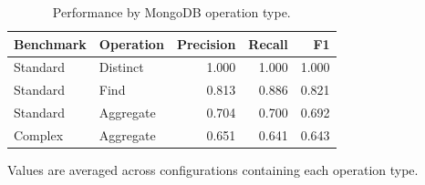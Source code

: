 \begin{table}[htbp]
\centering
\small
\caption{Performance by MongoDB operation type.}
\label{tab:operation-type-performance}
\begin{tabular}{llrrr}
\toprule
Benchmark & Operation & Precision & Recall & F1 \\
\midrule
Standard & Distinct & 1.000 & 1.000 & 1.000 \\
Standard & Find & 0.813 & 0.886 & 0.821 \\
Standard & Aggregate & 0.704 & 0.700 & 0.692 \\
Complex & Aggregate & 0.651 & 0.641 & 0.643 \\
\bottomrule
\end{tabular}
\par\footnotesize{Values are averaged across configurations containing each operation type.}
\end{table}
